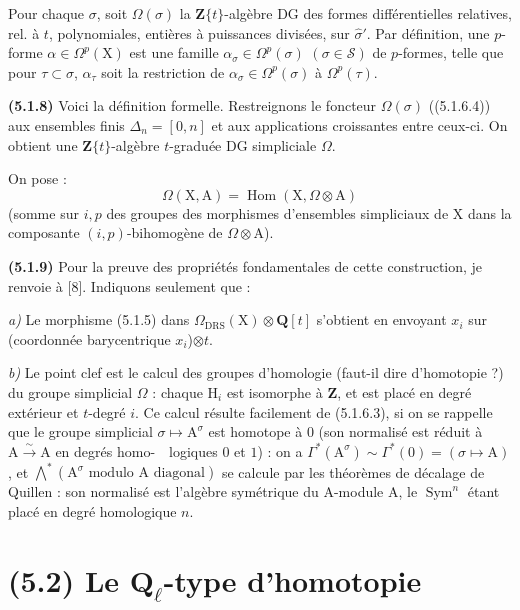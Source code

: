 \documentclass[11pt,leqno]{article}
\newcommand{\Page}[1]{\ifvmode\noindent\else\unskip\ \fi{\footnotesize\textcolor{gray}{[p.\,#1]}}\ \ignorespaces}
\begin{document}
Pour chaque \(\sigma\), soit \(\Omega(\sigma)\) la \(\mathbf{Z}\{t\}\)-algèbre DG des formes différentielles relatives, rel. à \(t\), polynomiales, entières à puissances divisées, sur \(\hat{\sigma}'\). Par définition, une \(p\)-forme \(\alpha\in\Omega^p(\mathrm{X})\) est une famille \(\alpha_{\sigma}\in\Omega^p(\sigma)\) \((\sigma\in\mathcal{S})\) de \(p\)-formes, telle que pour \(\tau\subset\sigma\), \(\alpha_{\tau}\) soit la restriction de \(\alpha_{\sigma}\in\Omega^p(\sigma)\) à \(\Omega^p(\tau)\).

\textbf{(5.1.8)} Voici la définition formelle. Restreignons le foncteur \(\Omega(\sigma)\) ((5.1.6.4)) aux ensembles finis \(\Delta_n=[0,n]\) et aux applications croissantes entre ceux-ci. On obtient une \(\mathbf{Z}\{t\}\)-algèbre \(t\)-graduée DG simpliciale \(\Omega\).

On pose :
\[
\Omega(\mathrm{X},\mathrm{A})=\operatorname{Hom}(\mathrm{X},\Omega\otimes\mathrm{A})
\]
(somme sur \(i,p\) des groupes des morphismes d’ensembles simpliciaux de \(\mathrm{X}\) dans la composante \((i,p)\)-bihomogène de \(\Omega\otimes\mathrm{A}\)).

\textbf{(5.1.9)} Pour la preuve des propriétés fondamentales de cette construction, je renvoie à [8]. Indiquons seulement que :

\textit{a)} Le morphisme (5.1.5) dans \(\Omega_{\mathrm{DRS}}(\mathrm{X})\otimes\mathbf{Q}[t]\) s’obtient en envoyant \(x_i\) sur (coordonnée barycentrique \(x_i\))\(\otimes t\).

\textit{b)} Le point clef est le calcul des groupes d’homologie (faut-il dire d’homotopie ?) du groupe simplicial \(\Omega\) : chaque \(\mathrm{H}_i\) est isomorphe à \(\mathbf{Z}\), et est placé en degré extérieur et \(t\)-degré \(i\). Ce calcul résulte facilement de (5.1.6.3), si on se rappelle que le groupe simplicial \(\sigma\mapsto\mathrm{A}^{\sigma}\) est homotope à \(0\) (son normalisé est réduit à \(\mathrm{A}\xrightarrow{\sim}\mathrm{A}\) en degrés homo-\Page{237}logiques \(0\) et \(1\)) : on a \(\Gamma^*(\mathrm{A}^{\sigma})\sim\Gamma^*(0)=(\sigma\mapsto\mathrm{A})\), et \(\bigwedge\limits^{*}(\mathrm{A}^{\sigma}\text{ modulo }\mathrm{A}\text{ diagonal})\) se calcule par les théorèmes de décalage de Quillen : son normalisé est l’algèbre symétrique du \(\mathrm{A}\)-module \(\mathrm{A}\), le \(\operatorname{Sym}^n\) étant placé en degré homologique \(n\).

\section*{(5.2) Le \(\mathbf{Q}_{\ell}\)-type d’homotopie}
\end{document}

